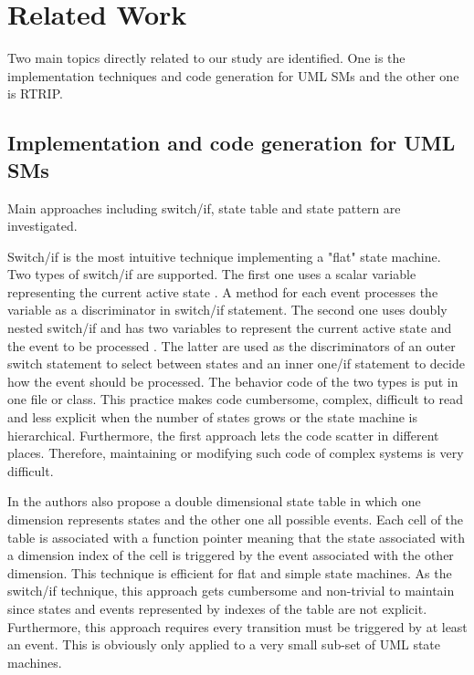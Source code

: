 \section{Related Work}
\label{sec:related_works}
Two main topics directly related to our study are identified. One is the implementation techniques and code generation for UML SMs and the other one is RTRIP.
\subsection{Implementation and code generation for UML SMs}
Main approaches including switch/if, state table and state pattern are investigated.

Switch/if is the most intuitive technique implementing a "flat" state machine. Two types of switch/if are supported. The first one uses a scalar variable representing the current active state \cite{Booch1998}. A method for each event processes the variable as a discriminator in switch/if statement. The second one uses doubly nested switch/if and has two variables to represent the current active state and the event to be processed \cite{Douglass1999}. The latter are used as the discriminators of an outer switch statement to select between states and an inner one/if statement to decide how the event should be processed. The behavior code of the two types is put in one file or class. This practice makes code cumbersome, complex, difficult to read and less explicit when the number of states grows or the state machine is hierarchical. Furthermore, the first approach lets the code scatter in different places. Therefore, maintaining or modifying such code of complex systems is very difficult.

In \cite{Douglass1999, Duby2001} the authors also propose a double dimensional state table in which one dimension represents states and the other one all possible events. Each cell of the table is associated with a function pointer meaning that the state associated with a dimension index of the cell is triggered by the event associated with the other dimension. This technique is efficient for flat and simple state machines. As the switch/if technique, this approach gets cumbersome and non-trivial to maintain since states and events represented by indexes of the table are not explicit. Furthermore, this approach requires every transition must be triggered by at least an event. This is obviously only applied to a very small sub-set of UML state machines.  
  
